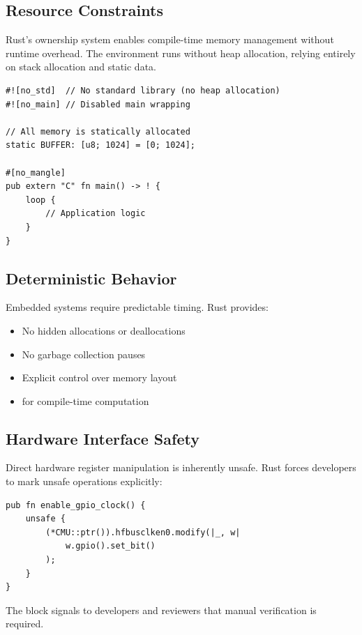 \subsection{Resource Constraints}

Rust's ownership system enables compile-time memory management without runtime overhead. The  environment runs without heap allocation, relying entirely on stack allocation and static data.

\begin{verbatim}
#![no_std]  // No standard library (no heap allocation)
#![no_main] // Disabled main wrapping

// All memory is statically allocated
static BUFFER: [u8; 1024] = [0; 1024];

#[no_mangle]
pub extern "C" fn main() -> ! {
    loop {
        // Application logic
    }
}
\end{verbatim}

\subsection{Deterministic Behavior}

Embedded systems require predictable timing. Rust provides:

\begin{itemize}
    \item No hidden allocations or deallocations
    \item No garbage collection pauses
    \item Explicit control over memory layout
    \item {} for compile-time computation
\end{itemize}

\subsection{Hardware Interface Safety}

Direct hardware register manipulation is inherently unsafe. Rust forces developers to mark unsafe operations explicitly:

\begin{verbatim}
pub fn enable_gpio_clock() {
    unsafe {
        (*CMU::ptr()).hfbusclken0.modify(|_, w|
            w.gpio().set_bit()
        );
    }
}
\end{verbatim}

The  block signals to developers and reviewers that manual verification is required.

